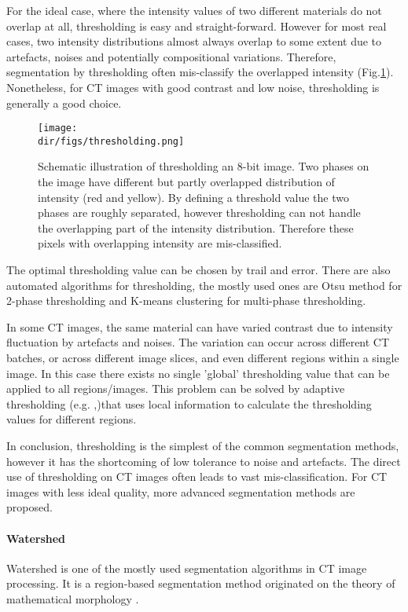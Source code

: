 For the ideal case, where the intensity values of two different materials do not overlap at all, thresholding is easy and straight-forward. However for most real cases, two intensity distributions almost always overlap to some extent due to artefacts, noises and potentially compositional variations. Therefore, segmentation by thresholding often mis-classify the overlapped intensity (Fig.\ref{thresholding}). Nonetheless, for CT images with good contrast and low noise, thresholding is generally a good choice.

\begin{figure}[htbp]
  \centering
  \texttt{[image: \\dir/figs/thresholding.png]}
  \caption{Schematic illustration of thresholding an 8-bit image. Two phases on the image have different but partly overlapped distribution of intensity (red and yellow). By defining a threshold value the two phases are roughly separated, however thresholding can not handle the overlapping part of the intensity distribution. Therefore these pixels with overlapping intensity are mis-classified.}
  \label{thresholding}
\end{figure}

The optimal thresholding value can be chosen by trail and error. There are also automated algorithms for thresholding, the mostly used ones are Otsu method \citep{otsu1979threshold} for 2-phase thresholding and K-means clustering \citep{ridler1978picture} for multi-phase thresholding. 

In some CT images, the same material can have varied contrast due to intensity fluctuation by artefacts and noises. The variation can occur across different CT batches, or across different image slices, and even different regions within a single image. In this case there exists no single 'global' thresholding value that can be applied to all regions/images. This problem can be solved by adaptive thresholding (e.g. \citet{sauvola2000adaptive},\citet{niblack1986introduction})that uses local information to calculate the thresholding values for different regions. 

In conclusion, thresholding is the simplest of the common segmentation methods, however it has the shortcoming of low tolerance to noise and artefacts. The direct use of thresholding on CT images often leads to vast mis-classification. For CT images with less ideal quality, more advanced segmentation methods are proposed.

\paragraph{Watershed}
Watershed is one of the mostly used segmentation algorithms in CT image processing. It is a region-based segmentation method originated on the theory of mathematical morphology \citep{serra1986introduction}.

